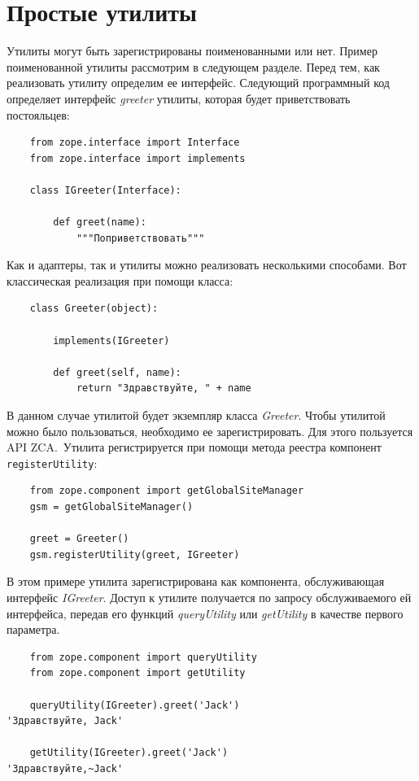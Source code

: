 \documentclass[a4paper,openany,twoside,final]{book}
\providecommand*{\DUroletitlereference}[1]{\textsl{#1}}
\begin{document}
\section{Простые утилиты%
  \label{id41}%
}

Утилиты могут быть зарегистрированы поименованными или нет.  Пример поименованной утилиты рассмотрим в следующем разделе.  Перед тем, как реализовать утилиту определим ее интерфейс.  Следующий программный код определяет интерфейс \DUroletitlereference{greeter} утилиты, которая будет приветствовать постояльцев:

\begin{verbatim}
    from zope.interface import Interface
    from zope.interface import implements

    class IGreeter(Interface):

        def greet(name):
            """Поприветствовать"""
\end{verbatim}

Как и адаптеры, так и утилиты можно реализовать несколькими способами.  Вот классическая реализация при помощи класса:

\begin{verbatim}
    class Greeter(object):

        implements(IGreeter)

        def greet(self, name):
            return "Здравствуйте, " + name
\end{verbatim}

В данном случае утилитой будет экземпляр класса \DUroletitlereference{Greeter}.  Чтобы утилитой можно было пользоваться, необходимо ее зарегистрировать.  Для этого пользуется API ZCA.~Утилита регистрируется при помощи метода реестра компонент \texttt{registerUtility}:

\begin{verbatim}
    from zope.component import getGlobalSiteManager
    gsm = getGlobalSiteManager()

    greet = Greeter()
    gsm.registerUtility(greet, IGreeter)
\end{verbatim}

В этом примере утилита зарегистрирована как компонента, обслуживающая интерфейс \DUroletitlereference{IGreeter}.  Доступ к утилите получается по запросу обслуживаемого ей интерфейса, передав его функций \DUroletitlereference{queryUtility} или \DUroletitlereference{getUtility} в качестве первого параметра.

\begin{verbatim}
    from zope.component import queryUtility
    from zope.component import getUtility

    queryUtility(IGreeter).greet('Jack')
'Здравствуйте, Jack'

    getUtility(IGreeter).greet('Jack')
'Здравствуйте,~Jack'
\end{verbatim}
\end{document}

